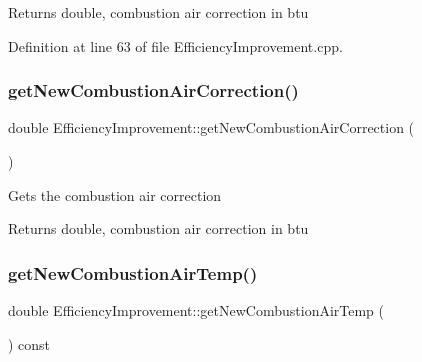 \begin{DoxyReturn}{Returns}
double, combustion air correction in btu 
\end{DoxyReturn}


Definition at line 63 of file Efficiency\+Improvement.\+cpp.

\mbox{\label{class_efficiency_improvement_abcbe174b3f94a20679dff0f5bff6a330}} 
\subsubsection{\texorpdfstring{get\+New\+Combustion\+Air\+Correction()}{getNewCombustionAirCorrection()}\hspace{0.1cm}{\footnotesize\ttfamily [3/3]}}
{\footnotesize\ttfamily double Efficiency\+Improvement\+::get\+New\+Combustion\+Air\+Correction (\begin{DoxyParamCaption}{ }\end{DoxyParamCaption})}

Gets the combustion air correction

\begin{DoxyReturn}{Returns}
double, combustion air correction in btu 
\end{DoxyReturn}
\mbox{\label{class_efficiency_improvement_a6a699fe87fec378962c2ee1505600dce}} 
\subsubsection{\texorpdfstring{get\+New\+Combustion\+Air\+Temp()}{getNewCombustionAirTemp()}\hspace{0.1cm}{\footnotesize\ttfamily [1/3]}}
{\footnotesize\ttfamily double Efficiency\+Improvement\+::get\+New\+Combustion\+Air\+Temp (\begin{DoxyParamCaption}{ }\end{DoxyParamCaption}) const\hspace{0.3cm}{\ttfamily [inline]}}

